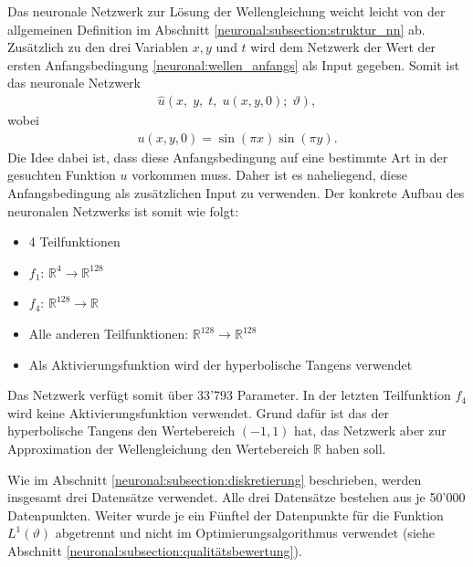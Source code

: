 Das neuronale Netzwerk zur Lösung der Wellengleichung weicht leicht von der allgemeinen Definition im Abschnitt \ref{neuronal:subsection:struktur_nn} ab.
Zusätzlich zu den drei Variablen $x, y$ und $t$ wird dem Netzwerk der Wert der ersten Anfangsbedingung \eqref{neuronal:wellen_anfangs} als Input gegeben.
Somit ist das neuronale Netzwerk
\begin{align*}
    \hat{u}(x,\; y,\; t,\; u(x, y, 0);\; \vartheta),
\end{align*}
wobei
\begin{align*}
    u(x, y, 0) = \sin(\pi x) \sin(\pi y).
\end{align*}
Die Idee dabei ist, dass diese Anfangsbedingung auf eine bestimmte Art in der gesuchten Funktion $u$ vorkommen muss.
Daher ist es naheliegend, diese Anfangsbedingung als zusätzlichen Input zu verwenden.
Der konkrete Aufbau des neuronalen Netzwerks ist somit wie folgt:
\begin{itemize}
    \item 4 Teilfunktionen
    \item \( f_1 \): \( \mathbb{R}^4 \longrightarrow \mathbb{R}^{128} \) 
    \item \( f_{4} \): \( \mathbb{R}^{128} \longrightarrow \mathbb{R} \)
    \item Alle anderen Teilfunktionen: \( \mathbb{R}^{128} \longrightarrow \mathbb{R}^{128} \)
    \item Als Aktivierungsfunktion wird der hyperbolische Tangens verwendet
\end{itemize}
Das Netzwerk verfügt somit über 33'793 Parameter.
In der letzten Teilfunktion \( f_{4} \) wird keine Aktivierungsfunktion verwendet.
Grund dafür ist das der hyperbolische Tangens den Wertebereich \((-1, 1)\) hat, das Netzwerk aber zur Approximation der Wellengleichung den Wertebereich \( \mathbb{R} \) haben soll.

Wie im Abschnitt \ref{neuronal:subsection:diskretierung} beschrieben, werden insgesamt drei Datensätze verwendet.
Alle drei Datensätze bestehen aus je 50'000 Datenpunkten.
Weiter wurde je ein Fünftel der Datenpunkte für die Funktion \( L^1(\vartheta) \) abgetrennt und nicht im Optimierungsalgorithmus verwendet (siehe Abschnitt \ref{neuronal:subsection:qualitätsbewertung}).

